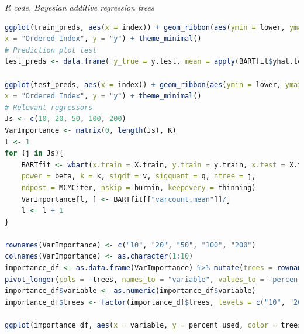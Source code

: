 \begin{tcolorbox}[enhanced,width=4.67in,center upper,
	fontupper=\large\bfseries,drop shadow southwest,sharp corners]
	\textit{R code. Bayesian additive regression trees}
	\begin{VF}
		\begin{lstlisting}[language=R]
ggplot(train_preds, aes(x = index)) + geom_ribbon(aes(ymin = lower, ymax = upper, fill = "95% Interval"), alpha = 0.4, show.legend = TRUE) + geom_line(aes(y = mean, color = "Predicted Mean")) + geom_line(aes(y = y_true, color = "True y")) + scale_color_manual(name = "Line", values = c("Predicted Mean" = "blue", "True y" = "black")) + scale_fill_manual(name = "Interval", values = c("95% Interval" = "lightblue")) + labs(title = "Training Data: Ordered Predictions with 95% Intervals",
x = "Ordered Index", y = "y") + theme_minimal()
# Prediction plot test
test_preds <- data.frame( y_true = y.test, mean = apply(BARTfit$yhat.test, 2, mean), lower = apply(BARTfit$yhat.test, 2, quantile, 0.025), upper = apply(BARTfit$yhat.test, 2, quantile, 0.975)) %>% arrange(y_true) %>% mutate(index = row_number())

ggplot(test_preds, aes(x = index)) + geom_ribbon(aes(ymin = lower, ymax = upper, fill = "95% Interval"), alpha = 0.4, show.legend = TRUE) + geom_line(aes(y = mean, color = "Predicted Mean")) + geom_line(aes(y = y_true, color = "True y")) + scale_color_manual(name = "Line", values = c("Predicted Mean" = "blue", "True y" = "black")) + scale_fill_manual(name = "Interval", values = c("95% Interval" = "lightblue")) + labs(title = "Test Data: Ordered Predictions with 95% Intervals",
x = "Ordered Index", y = "y") + theme_minimal()
# Relevant regressors
Js <- c(10, 20, 50, 100, 200)
VarImportance <- matrix(0, length(Js), K)
l <- 1
for (j in Js){
	BARTfit <- wbart(x.train = X.train, y.train = y.train, x.test = X.test, base = alpha,
	power = beta, k = k, sigdf = v, sigquant = q, ntree = j,
	ndpost = MCMCiter, nskip = burnin, keepevery = thinning)
	VarImportance[l, ] <- BARTfit[["varcount.mean"]]/j
	l <- l + 1
}

rownames(VarImportance) <- c("10", "20", "50", "100", "200")
colnames(VarImportance) <- as.character(1:10)
importance_df <- as.data.frame(VarImportance) %>% mutate(trees = rownames(.)) %>%
pivot_longer(cols = -trees, names_to = "variable", values_to = "percent_used")
importance_df$variable <- as.numeric(importance_df$variable)
importance_df$trees <- factor(importance_df$trees, levels = c("10", "20", "50", "100", "200"))

ggplot(importance_df, aes(x = variable, y = percent_used, color = trees, linetype = trees)) + geom_line() + geom_point() + scale_color_manual(values = c("10" = "red", "20" = "green", "50" = "blue", "100" = "cyan", "200" = "magenta")) + scale_x_continuous(breaks = 1:10) + labs(x = "variable", y = "percent used", color = "#trees", linetype = "#trees") + theme_minimal()
\end{lstlisting}
	\end{VF}
\end{tcolorbox}

